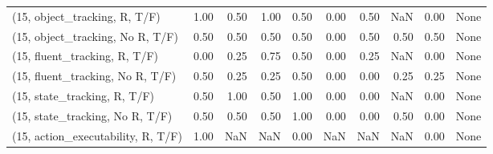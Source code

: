 \begin{table*}[h!]
\begin{adjustbox}{width=2\columnwidth,center}
\begin{tabular}{lrrr|rrr|rrr}
\midrule
(15, object\_tracking, R, T/F)         &                      1.00 &                  0.50 &                      1.00 &                          0.50 &                      0.00 &                          0.50 &                                    NaN &                               0.00 &                                  None \\
(15, object\_tracking, No R, T/F)      &                      0.50 &                  0.50 &                      0.50 &                          0.50 &                      0.00 &                          0.50 &                                   0.50 &                               0.50 &                                  None \\
(15, fluent\_tracking, R, T/F)         &                      0.00 &                  0.25 &                      0.75 &                          0.50 &                      0.00 &                          0.25 &                                    NaN &                               0.00 &                                  None \\
(15, fluent\_tracking, No R, T/F)      &                      0.50 &                  0.25 &                      0.25 &                          0.50 &                      0.00 &                          0.00 &                                   0.25 &                               0.25 &                                  None \\
(15, state\_tracking, R, T/F)          &                      0.50 &                  1.00 &                      0.50 &                          1.00 &                      0.00 &                          0.00 &                                    NaN &                               0.00 &                                  None \\
(15, state\_tracking, No R, T/F)       &                      0.50 &                  0.50 &                      0.50 &                          1.00 &                      0.00 &                          0.00 &                                   0.50 &                               0.00 &                                  None \\
(15, action\_executability, R, T/F)    &                      1.00 &                   NaN &                       NaN &                          0.00 &                       NaN &                           NaN &                                    NaN &                               0.00 &                                  None \\

\end{tabular}
\end{adjustbox}
\end{table*}
